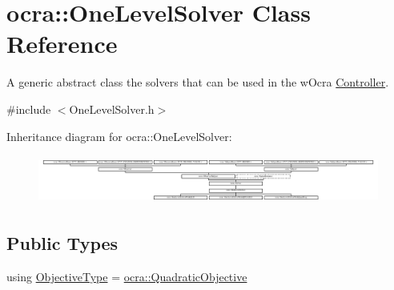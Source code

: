 \hypertarget{classocra_1_1OneLevelSolver}{}\section{ocra\+:\+:One\+Level\+Solver Class Reference}
\label{classocra_1_1OneLevelSolver}


A generic abstract class the solvers that can be used in the w\+Ocra \hyperlink{classocra_1_1Controller}{Controller}.  




{\ttfamily \#include $<$One\+Level\+Solver.\+h$>$}

Inheritance diagram for ocra\+:\+:One\+Level\+Solver\+:\begin{figure}[H]
\begin{center}
\leavevmode
\includegraphics[height=1.623188cm]{d2/d5e/classocra_1_1OneLevelSolver}
\end{center}
\end{figure}
\subsection*{Public Types}
\begin{DoxyCompactItemize}
\item 
using \hyperlink{classocra_1_1OneLevelSolver_a93b0be052a859bbd4c81584aa1646ffb}{Objective\+Type} = \hyperlink{namespaceocra_a0b50673710f087c0f1733aefd1a8e0f7}{ocra\+::\+Quadratic\+Objective}
\end{DoxyCompactItemize}
